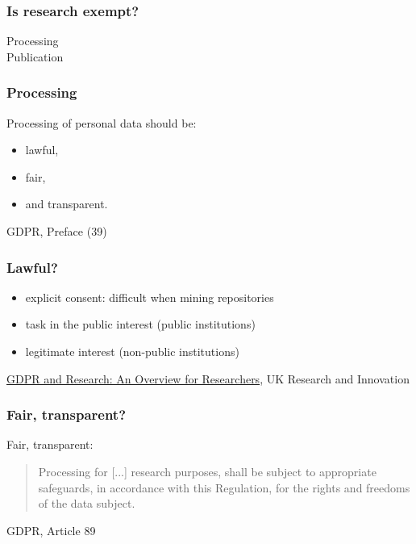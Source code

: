 \documentclass[17pt,aspectratio=169,hyperref={pdfusetitle,colorlinks,allcolors=olive}]{beamer}
\begin{document}
\begin{frame}[fragile]
  \frametitle{Is research exempt?}

  {\Large

    Processing \\
    \vspace{1cm}
    Publication \\
  }
\end{frame}

\begin{frame}[fragile]
  \frametitle{Processing}

  Processing of personal data should be:

  \begin{itemize}
  \item lawful,
  \item fair,
  \item and transparent.
  \end{itemize}

  \begin{flushright}
    GDPR, Preface (39)
  \end{flushright}

\end{frame}

\begin{frame}[fragile]
  \frametitle{Lawful?}

  \begin{itemize}
  \item explicit consent: difficult when mining repositories
  \item task in the public interest (public institutions)
  \item legitimate interest (non-public institutions)
  \end{itemize}

  \begin{flushright}
    \href{https://www.ukri.org/files/about/policy/ukri-gdpr-faqs-pdf}{GDPR and Research: An Overview for Researchers}, UK Research and Innovation
  \end{flushright}
\end{frame}

\begin{frame}[fragile]
  \frametitle{Fair, transparent?}

  Fair, transparent:
  
  \begin{quote}
  Processing for [...] research purposes, shall be subject to appropriate safeguards, in accordance with this Regulation, for the rights and freedoms of
the data subject.
  \end{quote}

  \begin{flushright}
    GDPR, Article 89
  \end{flushright}
\end{frame}
\end{document}
